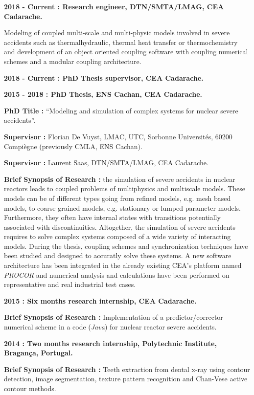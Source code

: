 \documentclass{article}
\renewenvironment{itemize}{
  \begin{list}{}{
      \setlength{\leftmargin}{1.5em}
      \setlength{\itemsep}{0.25em}
      \setlength{\parskip}{0pt}
      \setlength{\parsep}{0.25em}
    }
}{
  \end{list}
}
\begin{document}
	\begin{itemize}
		\item \textbf{2018 - Current : Research engineer, DTN/SMTA/LMAG, CEA Cadarache.}
			\begin{itemize}
				\item Modeling of coupled multi-scale and multi-physic models involved in severe accidents such as thermalhydraulic, thermal heat transfer or thermochemistry and development of an object oriented coupling software with coupling numerical schemes and a modular coupling architecture.
			\end{itemize}
		\item \textbf{2018 - Current : PhD Thesis supervisor, CEA Cadarache.}
		\item \textbf{2015 - 2018 : PhD Thesis, ENS Cachan, CEA Cadarache.}
			\begin{itemize}
				\item \textbf{PhD Title :} ``Modeling and simulation of complex systems for nuclear severe accidents''.
				\item \textbf{Supervisor :} Florian De Vuyst, LMAC, UTC, Sorbonne Universités, 60200 Compiègne (previously CMLA, ENS Cachan).
				\item \textbf{Supervisor :} Laurent Saas, DTN/SMTA/LMAG, CEA Cadarache.
				\item \textbf{Brief Synopsis of Research :} the simulation of severe accidents in nuclear reactors leads to coupled problems of multiphysics and multiscale models. These models can be of different types going from refined models, e.g. mesh based models, to coarse-grained models, e.g. stationary or lumped parameter models. Furthermore, they often have internal states with transitions potentially associated with discontinuities. Altogether, the simulation of severe accidents requires to solve complex systems composed of a wide variety of interacting models. During the thesis, coupling schemes and synchronization techniques have been studied and designed to accuratly solve these systems. A new software architecture has been integrated in the already existing CEA's platform named \textit{PROCOR} and numerical analysis and calculations have been performed on representative and real industrial test cases.
			\end{itemize}
	\item \textbf{2015 : Six months research internship, CEA Cadarache.}
		\begin{itemize}
			\item \textbf{Brief Synopsis of Research :} Implementation of a predictor/corrector numerical scheme in a code (\textit{Java}) for nuclear reactor severe accidents.
		\end{itemize}
	\item \textbf{2014 : Two months research internship, Polytechnic Institute, Bragança, Portugal.}
		\begin{itemize}
			\item \textbf{Brief Synopsis of Research :} Teeth extraction from dental x-ray using contour detection, image segmentation, texture pattern recognition and Chan-Vese active contour methods.
		\end{itemize}
\end{itemize}  
\end{document}
